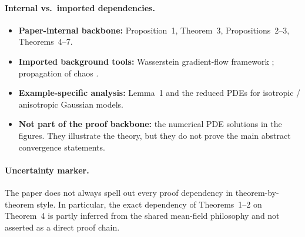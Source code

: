 \paragraph{Internal vs.\ imported dependencies.}
\begin{itemize}[leftmargin=1.5em]
\item \textbf{Paper-internal backbone:} Proposition~1, Theorem~3, Propositions~2--3, Theorems~4--7.
\item \textbf{Imported background tools:} Wasserstein gradient-flow framework \cite{jordan1998variational,ambrosio2008gradient}; propagation of chaos \cite{sznitman1991topics}.
\item \textbf{Example-specific analysis:} Lemma~1 and the reduced PDEs for isotropic / anisotropic Gaussian models.
\item \textbf{Not part of the proof backbone:} the numerical PDE solutions in the figures. They illustrate the theory, but they do not prove the main abstract convergence statements.
\end{itemize}

\paragraph{Uncertainty marker.}
The paper does not always spell out every proof dependency in theorem-by-theorem style. In particular, the exact dependency of Theorems~1--2 on Theorem~4 is partly inferred from the shared mean-field philosophy and not asserted as a direct proof chain.
